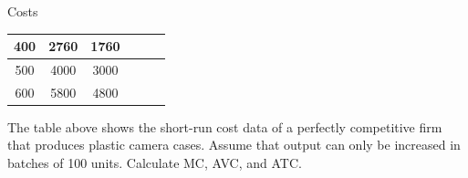 \documentclass{beamer}
\begin{document}
\begin{frame}[t]{Costs}
\begin{table}[H]
\begin{tabular}{cccccc}
    400      & 2760                                                  & 1760                                                    &                                                          &                                                                  &                                                               \\ \hline
    500      & 4000                                                  & 3000                                                    &                                                          &                                                                  &                                                               \\ \hline
    600      & 5800                                                  & 4800                                                    &                                                          &                                                                  &                                                              
    \end{tabular}
    \end{table}
    The table above shows the short-run cost data of a perfectly competitive firm that produces plastic camera cases. Assume that output can only be increased in batches of 100 units. Calculate MC, AVC, and ATC.
\end{frame}
\end{document}
